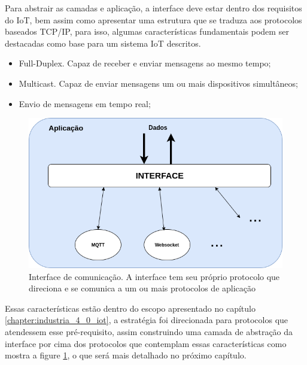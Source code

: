 Para abstrair as camadas e aplicação, a interface deve estar dentro dos requisitos do IoT, bem assim como apresentar uma estrutura que se traduza aos protocolos baseados TCP/IP, para isso, algumas características fundamentais podem ser destacadas como base para um sistema IoT descritos.

\begin{itemize}

\item Full-Duplex. Capaz de receber e enviar mensagens ao mesmo tempo;
\item Multicast. Capaz de enviar mensagens um ou mais dispositivos simultâneos;
\item Envio de mensagens em tempo real;

\end{itemize}


\begin{figure}[h!]
\label{fig:2.2.0/camada_abatracao}
\centering
\includegraphics[width=12cm]{./02_Capitulos/02_Cap2/figures/camada_abstracao}
\caption{Interface de comunicação. A interface tem seu próprio protocolo que direciona e se comunica a um ou mais protocolos de aplicação}
\end{figure}

Essas características estão dentro do escopo apresentado no capítulo \ref{chapter:industria_4_0_iot}, a estratégia foi direcionada para protocolos que atendessem esse pré-requisito, assim construindo uma camada de abstração da interface por cima dos protocolos que contemplam essas características como mostra a figure \ref{fig:2.2.0/camada_abatracao}, o que será mais detalhado no próximo capítulo.


